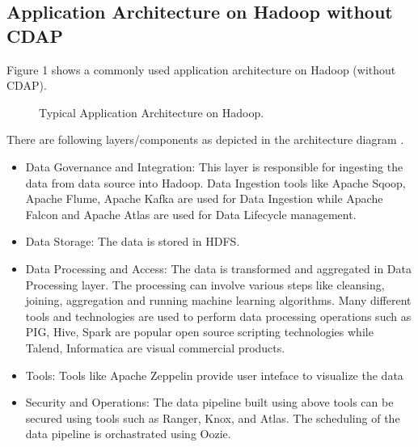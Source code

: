 \documentclass[9pt,twocolumn,twoside]{styles/osajnl}
\begin{document}
\subsection{Application Architecture on Hadoop without CDAP}
Figure 1 \cite{www-hdp-dataplatform} shows a commonly used application
architecture on Hadoop (without CDAP).


\begin{figure}[htbp]
\centering
{}
\caption{Typical Application Architecture on Hadoop.}
\label{fig:hadoop-arch}
\end{figure}

There are following layers/components as depicted in the architecture diagram
\cite{www-hdp-dataplatform}.

\begin{itemize}
\item Data Governance and Integration: This layer is responsible for ingesting
the data from data source into Hadoop. Data Ingestion tools like Apache
Sqoop, Apache Flume, Apache Kafka are used for Data Ingestion while Apache
Falcon and Apache Atlas are used for Data Lifecycle management.
\item Data Storage: The data is stored in HDFS.
\item Data Processing and Access: The data is transformed and aggregated in
Data Processing layer. The processing can involve various steps like cleansing,
joining, aggregation and running machine learning algorithms. Many different
tools and technologies are used to perform data processing operations such as
PIG, Hive, Spark are popular open source scripting technologies while
Talend, Informatica are visual commercial products.
\item Tools: Tools like Apache Zeppelin provide user inteface to visualize
the data
\item Security and Operations: The data pipeline built using above tools can
 be secured using tools such as Ranger, Knox, and Atlas. The scheduling of
 the data pipeline is orchastrated using Oozie.
\end{itemize}
\end{document}
